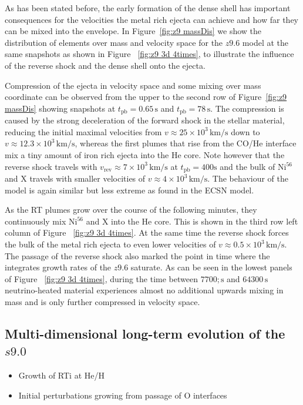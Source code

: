 \documentclass[fleqn,usenatbib]{mnras}
\newcommand{\nickel}{$\mathrm{Ni^{56}}$\xspace}
\newcommand{\tracer}{$\mathrm{X}$\xspace}
\renewcommand{\sec}{\xspace\ensuremath{\text{s}}}
\newcommand{\COM}[1]{{\color{orange}#1}}
\begin{document}
As has been stated before, the early formation of the dense shell has important consequences for the velocities the metal rich ejecta can achieve and how far they can be mixed into the envelope.
In Figure~\ref{fig:z9 massDis} we show the distribution of elements over mass and velocity space for the $z9.6$ model at the same snapshots as shown in Figure ~\ref{fig:z9 3d  4times}, to illustrate the influence of the reverse shock and the dense shell onto the ejecta.

Compression of the ejecta in velocity space and some mixing over mass coordinate can be observed from the upper to the second row of Figure~\ref{fig:z9 massDis} showing snapshots at $t_{\mathrm{pb}}=0.65\,\text{s}$ and $t_{\mathrm{pb}}=78\,\sec$. The compression is caused by the strong deceleration of the forward shock in the stellar material, reducing the initial maximal velocities from $v\approx 25\times10^3\,\mathrm{km/s}$ down to $v\approx 12.3\times10^3\,\mathrm{km/s}$, whereas the first plumes that rise from the CO/He interface mix a tiny amount of iron rich ejecta into the He core. Note however that the reverse shock travels with $v_{\mathrm{rev}}\approx 7\times10^3\,\mathrm{km/s}$ at $t_{\mathrm{pb}}=400\sec$ and the bulk of \nickel and \tracer travels with smaller velocities of $v\approx 4\times10^3\,\mathrm{km/s}$. The behaviour of the model is again similar but less extreme as found in the ECSN model.

As the RT plumes grow over the course of the following minutes, they continuously mix \nickel and \tracer into the He core. This is shown in the third row left column of Figure ~\ref{fig:z9 3d 4times}. At the same time the reverse shock forces the bulk of the metal rich ejecta to even lower velocities of  $v\approx 0.5\times10^3\,\mathrm{km/s}$. The passage of the reverse shock also marked the point in time where the integrates growth rates of the $z9.6$ saturate. As can be seen in the lowest panels of Figure ~\ref{fig:z9 3d 4times}, during the time between  $7700;\sec$ and $64300 \,\sec$ neutrino-heated material experiences almost no additional upwards mixing in mass and is only further compressed in velocity space. 

\subsection{Multi-dimensional long-term evolution of the $s9.0$}
\label{sec:Multi-dimensional long-term simulations of the s9.0-model}
\COM{
\begin{itemize}
    \item Growth of RTi at He/H
    \item Initial perturbations growing from passage of O interfaces
\end{itemize}
}
\end{document}
